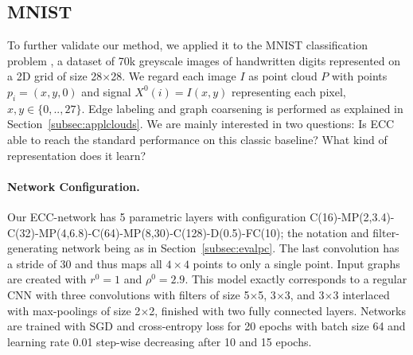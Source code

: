 \documentclass[10pt,twocolumn,letterpaper]{article}
\begin{document}
\begin{table}[bt]
\centering
\addtolength{\tabcolsep}{-3pt}
\addtolength{\tabcolsep}{3pt}
\vspace{1.5ex}
\caption{\label{tab:resgraph}
Mean accuracy (10 folds) on graph classification datasets. Only the best-performing models of each baseline are listed.}
\end{table}





\subsection{MNIST} \label{subsec:evalmnist}

To further validate our method, we applied it to the MNIST classification problem \cite{mnist}, a dataset of 70k greyscale images of handwritten digits represented on a 2D grid of size 28$\times$28. We regard each image $I$ as point cloud $P$ with points $p_i=(x,y,0)$ and signal $X^0(i)=I(x,y)$ representing each pixel, $x,y\in\{0,..,27\}$. Edge labeling and graph coarsening is performed as explained in Section~\ref{subsec:applclouds}. 
We are mainly interested in two questions: Is ECC able to reach the standard performance on this classic baseline? What kind of representation does it learn?

\paragraph*{Network Configuration.}
Our ECC-network has 5 parametric layers with configuration C(16)-MP(2,3.4)-C(32)-MP(4,6.8)-C(64)-MP(8,30)-C(128)-D(0.5)-FC(10); the notation and filter-generating network being as in Section~\ref{subsec:evalpc}. The last convolution has a stride of 30 and thus maps all $4\times 4$ points to only a single point. Input graphs are created with $r^0=1$ and $\rho^0=2.9$. This model exactly corresponds to a regular CNN with three convolutions with filters of size 5$\times$5, 3$\times$3, and 3$\times$3 interlaced with max-poolings of size 2$\times$2, finished with two fully connected layers. Networks are trained with SGD and cross-entropy loss for 20 epochs with batch size 64 and learning rate 0.01 step-wise decreasing after 10 and 15 epochs.
\end{document}
